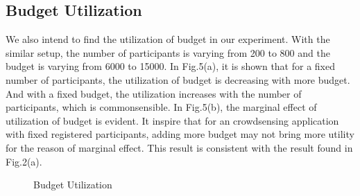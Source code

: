 \documentclass[conference,compsocconf,letterpaper,10pt]{IEEEtran}
\begin{document}
\subsection{Budget Utilization}
We also intend to find the utilization of budget in our experiment. With the similar setup, the number of participants is varying from 200 to 800 and the budget is varying from 6000 to 15000. In Fig.5(a), it is shown that for a fixed number of participants, the utilization of budget is decreasing with more budget. And with a fixed budget, the utilization increases with the number of participants, which is commonsensible. In Fig.5(b), the marginal effect of utilization of budget is evident. It inspire that for an crowdsensing application with fixed registered participants, adding more budget may not bring more utility for the reason of marginal effect. This result is consistent with the result found in Fig.2(a).
\begin{figure}[!t]
  \centering
  \vspace{-0.2cm}
  \caption{Budget Utilization}
  \vspace{-0.2cm}
\end{figure}
\end{document}
